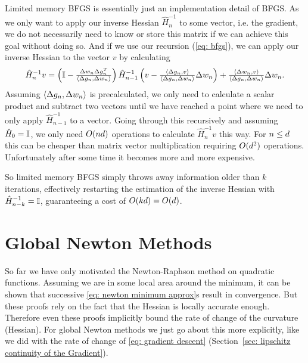 Limited memory BFGS is essentially just an implementation detail of BFGS. As
we only want to apply our inverse Hessian \(\hat{H}_n^{-1}\) to some vector,
i.e. the gradient, we do not necessarily need to know or store this matrix if
we can achieve this goal without doing so. And if we use our recursion (\ref{eq:
bfgs}), we can apply our inverse Hessian to the vector \(v\) by calculating
\begin{align*}
	\hat{H}_n^{-1}v =
	\left(\mathbb{I}-\tfrac{\Delta w_n \Delta g_n^T}{\langle \Delta g_n, \Delta w_n\rangle}\right)
	\hat{H}_{n-1}^{-1}
	\left(v-\tfrac{ \langle \Delta g_n, v\rangle}{\langle \Delta g_n, \Delta w_n\rangle}\Delta w_n\right)
	+ \tfrac{\langle \Delta w_n, v\rangle}{\langle \Delta g_n, \Delta w_n\rangle}\Delta w_n.
\end{align*}
Assuming \(\langle \Delta g_n, \Delta w_n\rangle\) is precalculated, we
only need to calculate a scalar product and subtract two vectors until we have
reached a point where we need to only apply \(\hat{H}_{n-1}^{-1}\) to a vector.
Going through this recursively and assuming \(\hat{H}_0=\mathbb{I}\), we only
need \(O(nd)\) operations to calculate \(\hat{H}_n^{-1}v\) this way.
For \(n\le d\) this can be cheaper than matrix vector multiplication
requiring \(O(d^2)\) operations. Unfortunately after some time it
becomes more and more expensive.

So limited memory BFGS simply throws away information older than \(k\) iterations,
effectively restarting the estimation of the inverse Hessian with
\(\hat{H}_{n-k}^{-1}=\mathbb{I}\), guaranteeing a cost of \(O(kd)=O(d)\).

\section{Global Newton Methods}

So far we have only motivated the Newton-Raphson method on quadratic functions.
Assuming we are in some local area around the minimum, it can be shown that
successive \ref{eq: newton minimum approx}s result in convergence. But these
proofs rely on the fact that the Hessian is locally accurate enough. Therefore
even these proofs implicitly bound the rate of change of the curvature (Hessian).
For global Newton methods we just go about this more explicitly, like we did
with the rate of change of \ref{eq: gradient descent} (Section~\ref{sec:
lipschitz continuity of the Gradient}).


